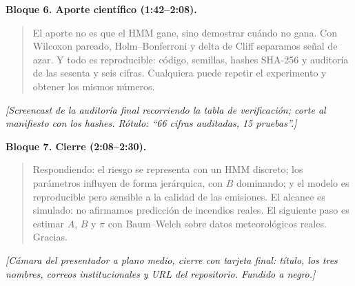 \documentclass[11pt,letterpaper]{article}
\begin{document}
\textbf{Bloque 6. Aporte científico (1:42--2:08).}
\begin{quote}\small
El aporte no es que el HMM gane, sino demostrar cuándo no gana. Con Wilcoxon pareado, Holm--Bonferroni y delta de Cliff separamos señal de azar. Y todo es reproducible: código, semillas, hashes SHA-256 y auditoría de las sesenta y seis cifras. Cualquiera puede repetir el experimento y obtener los mismos números.
\end{quote}
\noindent\emph{[Screencast de la auditoría final recorriendo la tabla de verificación; corte al manifiesto con los hashes. Rótulo: ``66 cifras auditadas, 15 pruebas''.]}

\medskip
\textbf{Bloque 7. Cierre (2:08--2:30).}
\begin{quote}\small
Respondiendo: el riesgo se representa con un HMM discreto; los parámetros influyen de forma jerárquica, con $B$ dominando; y el modelo es reproducible pero sensible a la calidad de las emisiones. El alcance es simulado: no afirmamos predicción de incendios reales. El siguiente paso es estimar $A$, $B$ y $\pi$ con Baum--Welch sobre datos meteorológicos reales. Gracias.
\end{quote}
\noindent\emph{[Cámara del presentador a plano medio, cierre con tarjeta final: título, los tres nombres, correos institucionales y URL del repositorio. Fundido a negro.]}
\end{document}

